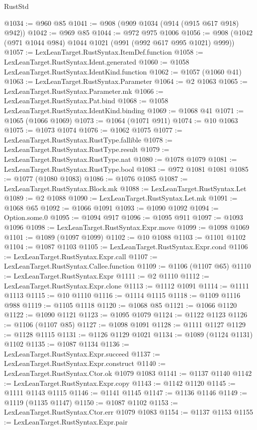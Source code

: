 \begin{lexlean}{RustStd}
\begin{coremodule}
@1034 := @960 @85
@1041 := @908 (@909 @1034 (@914 (@915 @617 @918) @942))
@1042 := @969 @85
@1044 := @972 @975 @1006
@1056 := @908 (@1042 (@971 @1044 @984) @1044 @1021 (@991 (@992 @617 @995 @1021) @999))
@1057 := LexLeanTarget.RustSyntax.ItemDef.function
@1058 := LexLeanTarget.RustSyntax.Ident.generated
@1060 := @1058 LexLeanTarget.RustSyntax.IdentKind.function
@1062 := @1057 (@1060 @41)
@1063 := LexLeanTarget.RustSyntax.Parameter
@1064 := @2 @1063
@1065 := LexLeanTarget.RustSyntax.Parameter.mk
@1066 := LexLeanTarget.RustSyntax.Pat.bind
@1068 := @1058 LexLeanTarget.RustSyntax.IdentKind.binding
@1069 := @1068 @41
@1071 := @1065 (@1066 @1069)
@1073 := @1064 (@1071 @911)
@1074 := @10 @1063
@1075 := @1073 @1074
@1076 := @1062 @1075
@1077 := LexLeanTarget.RustSyntax.RustType.fallible
@1078 := LexLeanTarget.RustSyntax.RustType.result
@1079 := LexLeanTarget.RustSyntax.RustType.nat
@1080 := @1078 @1079
@1081 := LexLeanTarget.RustSyntax.RustType.bool
@1083 := @972 @1081 @1081
@1085 := @1077 (@1080 @1083)
@1086 := @1076 @1085
@1087 := LexLeanTarget.RustSyntax.Block.mk
@1088 := LexLeanTarget.RustSyntax.Let
@1089 := @2 @1088
@1090 := LexLeanTarget.RustSyntax.Let.mk
@1091 := @1068 @65
@1092 := @1066 @1091
@1093 := @1090 @1092
@1094 := Option.some.{0}
@1095 := @1094 @917
@1096 := @1095 @911
@1097 := @1093 @1096
@1098 := LexLeanTarget.RustSyntax.Expr.move
@1099 := @1098 @1069
@1101 := @1089 (@1097 @1099)
@1102 := @10 @1088
@1103 := @1101 @1102
@1104 := @1087 @1103
@1105 := LexLeanTarget.RustSyntax.Expr.cond
@1106 := LexLeanTarget.RustSyntax.Expr.call
@1107 := LexLeanTarget.RustSyntax.Callee.function
@1109 := @1106 (@1107 @65)
@1110 := LexLeanTarget.RustSyntax.Expr
@1111 := @2 @1110
@1112 := LexLeanTarget.RustSyntax.Expr.clone
@1113 := @1112 @1091
@1114 := @1111 @1113
@1115 := @10 @1110
@1116 := @1114 @1115
@1118 := @1109 @1116 @988
@1119 := @1105 @1118
@1120 := @1068 @85
@1121 := @1066 @1120
@1122 := @1090 @1121
@1123 := @1095 @1079
@1124 := @1122 @1123
@1126 := @1106 (@1107 @85)
@1127 := @1098 @1091
@1128 := @1111 @1127
@1129 := @1128 @1115
@1131 := @1126 @1129 @1021
@1134 := @1089 (@1124 @1131) @1102
@1135 := @1087 @1134
@1136 := LexLeanTarget.RustSyntax.Expr.succeed
@1137 := LexLeanTarget.RustSyntax.Expr.construct
@1140 := LexLeanTarget.RustSyntax.Ctor.ok @1079 @1083
@1141 := @1137 @1140
@1142 := LexLeanTarget.RustSyntax.Expr.copy
@1143 := @1142 @1120
@1145 := @1111 @1143 @1115
@1146 := @1141 @1145
@1147 := @1136 @1146
@1149 := @1119 (@1135 @1147)
@1150 := @1087 @1102
@1153 := LexLeanTarget.RustSyntax.Ctor.err @1079 @1083
@1154 := @1137 @1153
@1155 := LexLeanTarget.RustSyntax.Expr.pair

\end{coremodule}
\end{lexlean}

